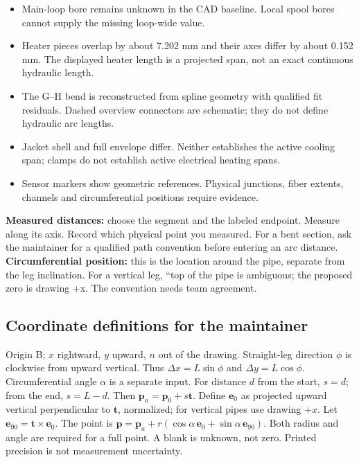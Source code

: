 \documentclass[11pt]{article}
\begin{document}
\begin{itemize}
\item Main-loop bore remains unknown in the CAD baseline. Local spool bores cannot supply the missing loop-wide value.
\item Heater pieces overlap by about 7.202 mm and their axes differ by about 0.152 mm. The displayed heater length is a projected span, not an exact continuous hydraulic length.
\item The G--H bend is reconstructed from spline geometry with qualified fit residuals. Dashed overview connectors are schematic; they do not define hydraulic arc lengths.
\item Jacket shell and full envelope differ. Neither establishes the active cooling span; clamps do not establish active electrical heating spans.
\item Sensor markers show geometric references. Physical junctions, fiber extents, channels and circumferential positions require evidence.
\end{itemize}
\textbf{Measured distances:} choose the segment and the labeled endpoint. Measure along its axis. Record which physical point you measured. For a bent section, ask the maintainer for a qualified path convention before entering an arc distance.
\textbf{Circumferential position:} this is the location around the pipe, separate from the leg inclination. For a vertical leg, ``top of the pipe is ambiguous; the proposed zero is drawing +x. The convention needs team agreement.
\subsection*{Coordinate definitions for the maintainer}
Origin B; $x$ rightward, $y$ upward, $n$ out of the drawing. Straight-leg direction $\phi$ is clockwise from upward vertical. Thus $\Delta x=L\sin\phi$ and $\Delta y=L\cos\phi$. Circumferential angle $\alpha$ is a separate input.
For distance $d$ from the start, $s=d$; from the end, $s=L-d$. Then $\mathbf{p}_{a}=\mathbf{p}_0+s\mathbf{t}$. Define $\mathbf{e}_0$ as projected upward vertical perpendicular to $\mathbf{t}$, normalized; for vertical pipes use drawing $+x$. Let $\mathbf{e}_{90}=\mathbf{t}\times\mathbf{e}_0$. The point is $\mathbf{p}=\mathbf{p}_{a}+r(\cos\alpha\,\mathbf{e}_0+\sin\alpha\,\mathbf{e}_{90})$.
Both radius and angle are required for a full point. A blank is unknown, not zero. Printed precision is not measurement uncertainty.
\end{document}
